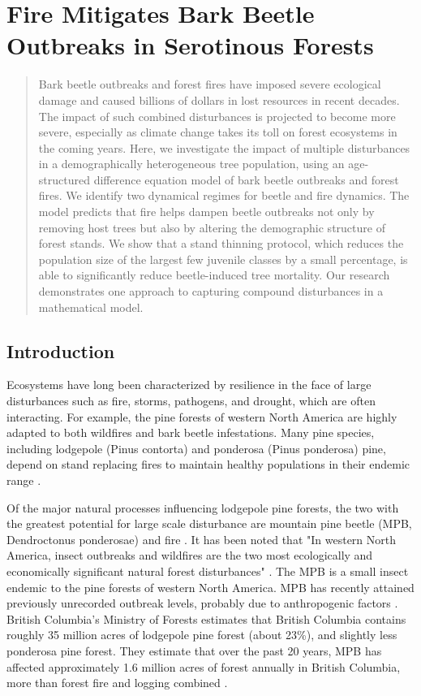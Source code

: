 \chapter{Fire Mitigates Bark Beetle Outbreaks in Serotinous Forests}
\label{ch3}
\begin{abstract}
Bark beetle outbreaks and forest fires have imposed severe ecological damage and caused billions of dollars in lost resources in recent decades. The impact of such combined disturbances is projected to become more severe, especially as climate change takes its toll on forest ecosystems in the coming years. Here, we investigate the impact of multiple disturbances in a demographically heterogeneous tree population, using an age-structured difference equation model of bark beetle outbreaks and forest fires. We identify two dynamical regimes for beetle and fire dynamics. The model predicts that fire helps dampen beetle outbreaks not only by removing host trees but also by altering the demographic structure of forest stands. We show that a stand thinning protocol, which reduces the population size of the largest few juvenile classes by a small percentage, is able to significantly reduce beetle-induced tree mortality.  Our research demonstrates one approach to capturing compound disturbances in a mathematical model.
\end{abstract}

\section{Introduction}

Ecosystems have long been characterized by resilience in the face of large disturbances such as fire, storms, pathogens, and drought, which are often interacting. For example, the pine forests of western North America are highly adapted to both wildfires and bark beetle infestations. Many pine species, including lodgepole (Pinus contorta) and ponderosa (Pinus ponderosa) pine, depend on stand replacing fires to maintain healthy populations in their endemic range \cite{bentz2010climate}. 

Of the major natural processes influencing lodgepole pine forests, the two with the greatest potential for large scale disturbance are mountain pine beetle (MPB, Dendroctonus ponderosae) and fire \cite{kaufmann2008status}. It has been noted that "In western North America, insect outbreaks and wildfires are the two most ecologically and economically significant natural forest disturbances" \cite{meigs2016insect}. The MPB is a small insect endemic to the pine forests of western North America. MPB has recently attained previously unrecorded outbreak levels, probably due to anthropogenic factors \cite{bentz2010climate,safranyik2007mountain}.  British Columbia's Ministry of Forests estimates that British Columbia contains roughly 35 million acres of lodgepole pine forest (about 23\%), and slightly less ponderosa pine forest. They estimate that over the past 20 years, MPB has affected approximately 1.6 million acres of forest annually in British Columbia, more than forest fire and logging combined \cite{bc2010state}.

